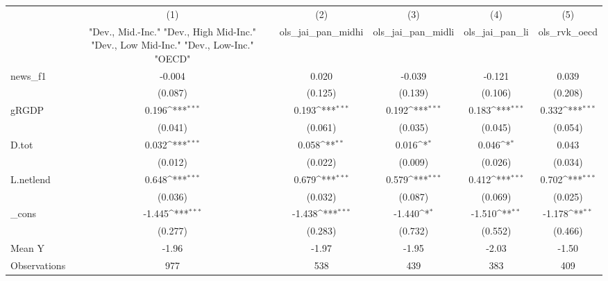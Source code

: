 {
\def\sym#1{\ifmmode^{#1}\else\(^{#1}\)\fi}
\begin{tabular}{l*{5}{c}}
\toprule
            &\multicolumn{1}{c}{(1)}&\multicolumn{1}{c}{(2)}&\multicolumn{1}{c}{(3)}&\multicolumn{1}{c}{(4)}&\multicolumn{1}{c}{(5)}\\
            &\multicolumn{1}{c}{ "Dev., Mid.-Inc." "Dev., High Mid-Inc." "Dev., Low Mid-Inc." "Dev., Low-Inc." "OECD" }&\multicolumn{1}{c}{ols\_jai\_pan\_midhi}&\multicolumn{1}{c}{ols\_jai\_pan\_midli}&\multicolumn{1}{c}{ols\_jai\_pan\_li}&\multicolumn{1}{c}{ols\_rvk\_oecd}\\
\midrule
news\_f1     &      -0.004         &       0.020         &      -0.039         &      -0.121         &       0.039         \\
            &     (0.087)         &     (0.125)         &     (0.139)         &     (0.106)         &     (0.208)         \\
\addlinespace
gRGDP       &       0.196\sym{***}&       0.193\sym{***}&       0.192\sym{***}&       0.183\sym{***}&       0.332\sym{***}\\
            &     (0.041)         &     (0.061)         &     (0.035)         &     (0.045)         &     (0.054)         \\
\addlinespace
D.tot       &       0.032\sym{***}&       0.058\sym{**} &       0.016\sym{*}  &       0.046\sym{*}  &       0.043         \\
            &     (0.012)         &     (0.022)         &     (0.009)         &     (0.026)         &     (0.034)         \\
\addlinespace
L.netlend   &       0.648\sym{***}&       0.679\sym{***}&       0.579\sym{***}&       0.412\sym{***}&       0.702\sym{***}\\
            &     (0.036)         &     (0.032)         &     (0.087)         &     (0.069)         &     (0.025)         \\
\addlinespace
\_cons      &      -1.445\sym{***}&      -1.438\sym{***}&      -1.440\sym{*}  &      -1.510\sym{**} &      -1.178\sym{**} \\
            &     (0.277)         &     (0.283)         &     (0.732)         &     (0.552)         &     (0.466)         \\
\midrule
Mean Y      &       -1.96         &       -1.97         &       -1.95         &       -2.03         &       -1.50         \\
Observations&         977         &         538         &         439         &         383         &         409         \\
\bottomrule
\end{tabular}
}
